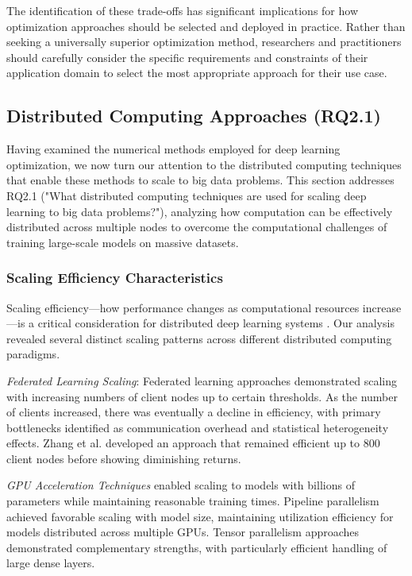 The identification of these trade-offs has significant implications for how optimization approaches should be selected and deployed in practice. Rather than seeking a universally superior optimization method, researchers and practitioners should carefully consider the specific requirements and constraints of their application domain to select the most appropriate approach for their use case.

\subsection{Distributed Computing Approaches (RQ2.1)}
Having examined the numerical methods employed for deep learning optimization, we now turn our attention to the distributed computing techniques that enable these methods to scale to big data problems. This section addresses RQ2.1 ("What distributed computing techniques are used for scaling deep learning to big data problems?"), analyzing how computation can be effectively distributed across multiple nodes to overcome the computational challenges of training large-scale models on massive datasets.

\subsubsection{Scaling Efficiency Characteristics}
Scaling efficiency—how performance changes as computational resources increase—is a critical consideration for distributed deep learning systems \citep{Zhang20229876}. Our analysis revealed several distinct scaling patterns across different distributed computing paradigms.

\textit{Federated Learning Scaling}: Federated learning approaches demonstrated scaling with increasing numbers of client nodes up to certain thresholds. As the number of clients increased, there was eventually a decline in efficiency, with primary bottlenecks identified as communication overhead and statistical heterogeneity effects. Zhang et al. \citep{Zhang20229876} developed an approach that remained efficient up to 800 client nodes before showing diminishing returns.

\textit{GPU Acceleration Techniques} enabled scaling to models with billions of parameters while maintaining reasonable training times. Pipeline parallelism achieved favorable scaling with model size, maintaining utilization efficiency for models distributed across multiple GPUs. Tensor parallelism approaches demonstrated complementary strengths, with particularly efficient handling of large dense layers.

